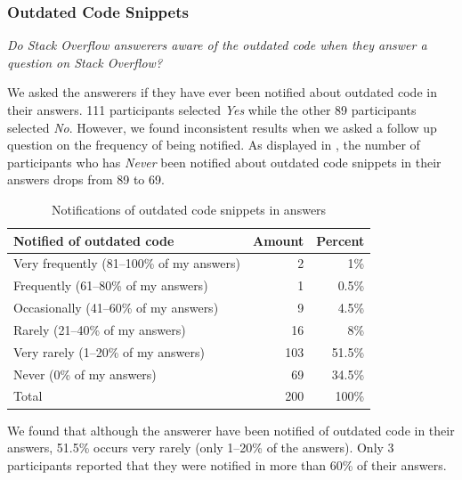 \documentclass[10pt,journal,compsoc]{IEEEtran}
\begin{document}
\subsubsection{Outdated Code Snippets} 
\vspace{0.25cm}
\textit{Do Stack Overflow
	answerers aware of the outdated code when
	they answer a question on Stack Overflow?} 
\vspace{0.25cm}

We asked the answerers if they have ever been notified about outdated code in
their answers. 111 participants selected \textit{Yes} while the other 89 participants
selected \textit{No}. However, we found inconsistent results when we asked a follow up
question on the frequency of being notified. As displayed in
, the number of participants who has
\textit{Never} been notified about outdated code snippets in their answers drops
from 89 to 69.

\begin{table}
	\centering
	\caption{Notifications of outdated code snippets in answers}
	\label{tab:survey_code_snippet_outdated}
	\begin{tabular}{lrr}
		\toprule
		Notified of outdated code & Amount & Percent \\
		\midrule
		Very frequently (81--100\% of my answers) & 2 & 1\% \\
		Frequently (61--80\% of my answers) & 1 & 0.5\% \\
		Occasionally (41--60\% of my answers) & 9 & 4.5\% \\
		Rarely (21--40\% of my answers) & 16 & 8\% \\
		Very rarely (1--20\% of my answers) & 103 & 51.5\% \\
		Never (0\% of my answers) & 69 & 34.5\% \\
		\midrule
		Total & 200 & 100\% \\
		\bottomrule
	\end{tabular}
\end{table}

We found that although the answerer have been notified of
outdated code in their answers, 51.5\% occurs very rarely (only 1--20\% of the answers). 
Only 3 participants reported that they were notified in more than 60\% of their answers.
\end{document}
